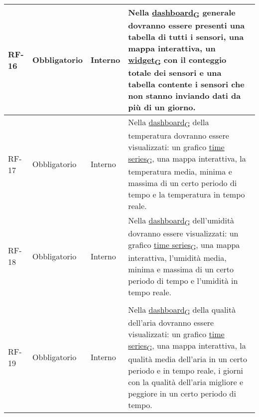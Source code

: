 \begin{longtable}{|>{\centering\arraybackslash}m{}|>{\centering\arraybackslash}m{}|>{\centering\arraybackslash}m{}|>{\centering\arraybackslash}m{}|}
	RF-16           & Obbligatorio        & Interno        & Nella \href{https://7last.github.io/docs/rtb/documentazione-interna/glossario\#dashboard}{dashboard\textsubscript{G}} generale dovranno essere presenti una tabella di tutti i sensori, una mappa interattiva, un \href{https://7last.github.io/docs/rtb/documentazione-interna/glossario\#widget}{widget\textsubscript{G}} con il conteggio totale dei sensori e una tabella contente i sensori che non stanno inviando dati da più di un giorno.                                                               \\\hline
	RF-17           & Obbligatorio        & Interno        & Nella \href{https://7last.github.io/docs/rtb/documentazione-interna/glossario\#dashboard}{dashboard\textsubscript{G}} della temperatura dovranno essere visualizzati: un grafico \href{https://7last.github.io/docs/rtb/documentazione-interna/glossario\#time-series}{time series\textsubscript{G}}, una mappa interattiva, la temperatura media, minima e massima di un certo periodo di tempo e la temperatura in tempo reale.                                                                                     \\\hline
	RF-18           & Obbligatorio        & Interno        & Nella \href{https://7last.github.io/docs/rtb/documentazione-interna/glossario\#dashboard}{dashboard\textsubscript{G}} dell'umidità dovranno essere visualizzati: un grafico \href{https://7last.github.io/docs/rtb/documentazione-interna/glossario\#time-series}{time series\textsubscript{G}}, una mappa interattiva, l'umidità media, minima e massima di un certo periodo di tempo e l'umidità in tempo reale.                                                                                                    \\\hline                                                                                                                                                                                                                                                                                                        \\\hline
	RF-19           & Obbligatorio        & Interno        & Nella \href{https://7last.github.io/docs/rtb/documentazione-interna/glossario\#dashboard}{dashboard\textsubscript{G}} della qualità dell'aria dovranno essere visualizzati: un grafico \href{https://7last.github.io/docs/rtb/documentazione-interna/glossario\#time-series}{time series\textsubscript{G}}, una mappa interattiva, la qualità media dell'aria in un certo periodo e in tempo reale, i giorni con la qualità dell'aria migliore e peggiore in un certo periodo di tempo.                               \\\hline

\end{longtable}
